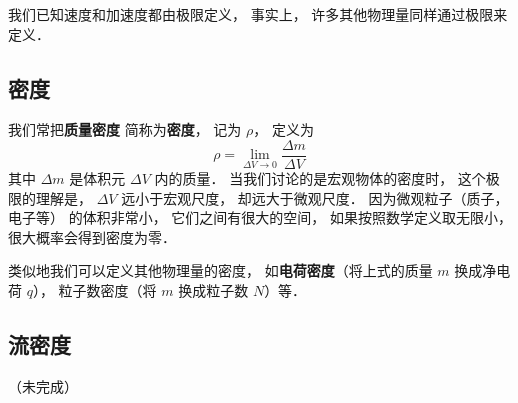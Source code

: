 
\begin{issues}
\issueDraft
\end{issues}



我们已知速度和加速度都由极限定义， 事实上， 许多其他物理量同样通过极限来定义．

\subsection{密度}
我们常把\textbf{质量密度} 简称为\textbf{密度}， 记为 $\rho$， 定义为
\begin{equation}
\rho = \lim_{\Delta V \to 0} \frac{\Delta m}{\Delta V}
\end{equation}
其中 $\Delta m$ 是体积元 $\Delta V$ 内的质量． 当我们讨论的是宏观物体的密度时， 这个极限的理解是， $\Delta V$ 远小于宏观尺度， 却远大于微观尺度． 因为微观粒子（质子， 电子等） 的体积非常小， 它们之间有很大的空间， 如果按照数学定义取无限小， 很大概率会得到密度为零．

类似地我们可以定义其他物理量的密度， 如\textbf{电荷密度}（将上式的质量 $m$ 换成净电荷 $q$）， 粒子数密度（将 $m$ 换成粒子数 $N$）等．

\subsection{流密度}
（未完成）




